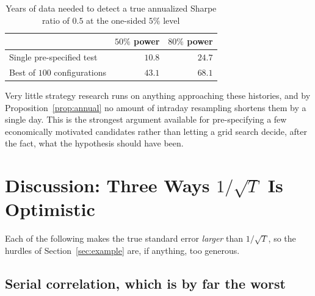 \documentclass[11pt]{article}
\theoremstyle{remark}
\theoremstyle{definition}
\begin{document}
\begin{table}[htbp]
\centering
\caption{Years of data needed to detect a true annualized Sharpe ratio of $0.5$ at the one-sided $5\%$ level}
\label{tab:power}
\begin{tabular}{lrr}
\toprule
 & $50\%$ power & $80\%$ power \\
\midrule
Single pre-specified test & $10.8$ & $24.7$ \\
Best of $100$ configurations & $43.1$ & $68.1$ \\
\bottomrule
\end{tabular}
\end{table}

Very little strategy research runs on anything approaching these histories, and by Proposition~\ref{prop:annual} no amount of intraday resampling shortens them by a single day. This is the strongest argument available for pre-specifying a few economically motivated candidates rather than letting a grid search decide, after the fact, what the hypothesis should have been.

\section{Discussion: Three Ways \texorpdfstring{$1/\sqrt{T}$}{1/sqrt(T)} Is Optimistic}
\label{sec:discussion}

Each of the following makes the true standard error \emph{larger} than $1/\sqrt{T}$, so the hurdles of Section~\ref{sec:example} are, if anything, too generous.

\subsection{Serial correlation, which is by far the worst}
\end{document}
